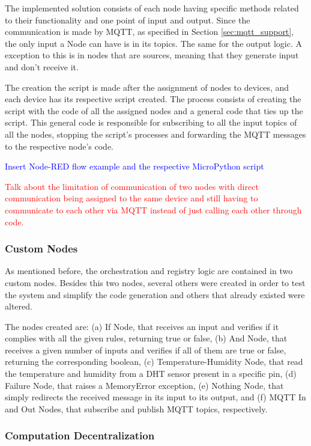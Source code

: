 The implemented solution consists of each node having specific methods related to their functionality and one point of input and output. Since the communication is made by MQTT, as specified in Section \ref{sec:mqtt_support}, the only input a Node can have is in its topics. The same for the output logic. A exception to this is in nodes that are sources, meaning that they generate input and don't receive it. 

The creation the script is made after the assignment of nodes to devices, and each device has its respective script created. The process consists of creating the script with the code of all the assigned nodes and a general code that ties up the script. This general code is responsible for subscribing to all the input topics of all the nodes, stopping the script's processes and forwarding the MQTT messages to the respective node's code.

\textcolor{blue}{Insert Node-RED flow example and the respective MicroPython script}

\textcolor{red}{Talk about the limitation of communication of two nodes with direct communication being assigned to the same device and still having to communicate to each other via MQTT instead of just calling each other through code.}

\subsubsection{Custom Nodes}\label{sec:custom_nodes}

As mentioned before, the orchestration and registry logic are contained in two custom nodes. Besides this two nodes, several others were created in order to test the system and simplify the code generation and others that already existed were altered. 

The nodes created are: (a) If Node, that receives an input and verifies if it complies with all the given rules, returning true or false, (b) And Node, that receives a given number of inputs and verifies if all of them are true or false, returning the corresponding boolean, (c) Temperature-Humidity Node, that read the temperature and humidity from a DHT sensor present in a specific pin, (d) Failure Node, that raises a MemoryError exception, (e) Nothing Node, that simply redirects the received message in its input to its output, and (f) MQTT In and Out Nodes, that subscribe and publish MQTT topics, respectively.

\subsubsection{Computation Decentralization}\label{sec:node_red_computation_decentralization}

